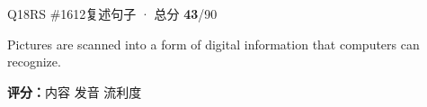 \begin{qblock}{Q18\quad RS \#1612}{复述句子 · 总分 \textcolor{cAccent}{\bfseries 43}/90}
\begin{promptbox}
Pictures are scanned into a form of digital information that computers can recognize.
\end{promptbox}
\asrlegend
\begin{asrbox}
            
\end{asrbox}
\smallskip
{\small\textbf{评分：}内容  \quad\textperiodcentered\quad 发音  \quad\textperiodcentered\quad 流利度 }
\end{qblock}

